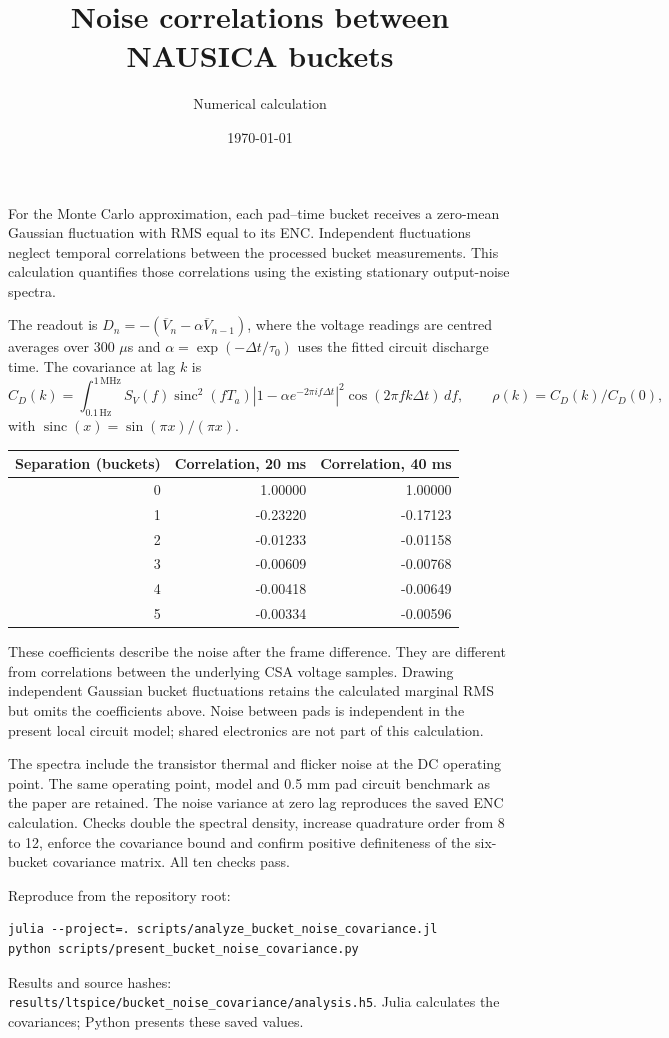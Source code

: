 \documentclass[11pt,a4paper]{article}
\title{Noise correlations between NAUSICA buckets}
\author{Numerical calculation}\date{\today}
\begin{document}
\maketitle
For the Monte Carlo approximation, each pad--time bucket receives a zero-mean
Gaussian fluctuation with RMS equal to its ENC. Independent fluctuations neglect
temporal correlations between the processed bucket measurements. This calculation
quantifies those correlations using the existing stationary output-noise spectra.

The readout is $D_n=-(\overline V_n-\alpha\overline V_{n-1})$,
where the voltage readings are centred averages over 300 $\mu$s and
$\alpha=\exp(-\Delta t/\tau_0)$ uses the fitted circuit discharge time.
The covariance at lag $k$ is
\[
 C_D(k)=\int_{0.1\,\mathrm{Hz}}^{1\,\mathrm{MHz}} S_V(f)
 \operatorname{sinc}^2(fT_a)
 |1-\alpha e^{-2\pi i f\Delta t}|^2
 \cos(2\pi f k\Delta t)\,df,
\qquad \rho(k)=C_D(k)/C_D(0),
\]
with $\operatorname{sinc}(x)=\sin(\pi x)/(\pi x)$.

\begin{center}\begin{tabular}{rrr}\toprule
Separation (buckets) & Correlation, 20 ms & Correlation, 40 ms\\\midrule
0 & 1.00000 & 1.00000 \\
1 & -0.23220 & -0.17123 \\
2 & -0.01233 & -0.01158 \\
3 & -0.00609 & -0.00768 \\
4 & -0.00418 & -0.00649 \\
5 & -0.00334 & -0.00596 \\
\bottomrule\end{tabular}\end{center}
These coefficients describe the noise after the frame difference. They are
different from correlations between the underlying CSA voltage samples.
Drawing independent Gaussian bucket fluctuations retains the calculated marginal
RMS but omits the coefficients above. Noise between pads is independent in the
present local circuit model; shared electronics are not part of this calculation.

The spectra include the transistor thermal and flicker noise at the DC operating
point. The same operating point, model and 0.5 mm pad circuit benchmark as the
paper are retained. The noise variance at zero lag reproduces the saved ENC
calculation. Checks double the spectral density, increase quadrature order from
8 to 12, enforce the covariance bound and confirm positive definiteness of the
six-bucket covariance matrix. All ten checks pass.

Reproduce from the repository root:
\begin{verbatim}
julia --project=. scripts/analyze_bucket_noise_covariance.jl
python scripts/present_bucket_noise_covariance.py
\end{verbatim}
Results and source hashes: \texttt{results/ltspice/bucket\_noise\_covariance/analysis.h5}.
Julia calculates the covariances; Python presents these saved values.
\end{document}
